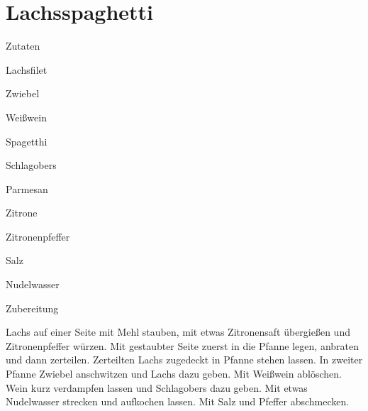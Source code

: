\chapter*{Lachsspaghetti}
\begin{multicols}{2}
 {\Large Zutaten}
 \begin{Zutaten}
		\item Lachsfilet
		\item Zwiebel
		\item Weißwein
		\item Spagetthi
		\item Schlagobers
		\item Parmesan
		\item Zitrone
		\item Zitronenpfeffer
		\item Salz
		\item Nudelwasser
		
		
		
		
		
		
\end{Zutaten}
\columnbreak
\end{multicols}

{\Large Zubereitung} \newline
\begin{addmargin}[1cm]{0cm}
	Lachs auf einer Seite mit Mehl stauben, mit etwas Zitronensaft übergießen und Zitronenpfeffer
	würzen.\newline
	Mit gestaubter Seite zuerst in die Pfanne legen, anbraten und dann zerteilen.
	Zerteilten Lachs zugedeckt in Pfanne stehen lassen.\newline
	In zweiter Pfanne Zwiebel anschwitzen und Lachs dazu geben.\newline
	Mit Weißwein ablöschen. Wein kurz verdampfen lassen und Schlagobers dazu geben. Mit etwas
	Nudelwasser strecken und aufkochen lassen.\newline
	Mit Salz und Pfeffer abschmecken.
		
	
\end{addmargin}
